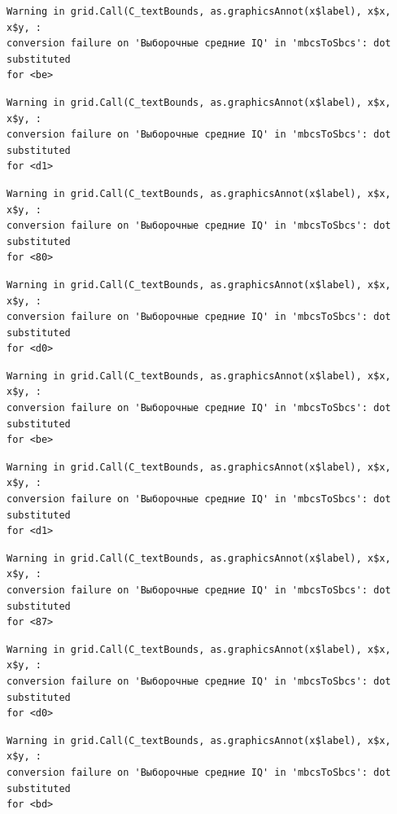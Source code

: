\documentclass[
  letterpaper,
]{scrbook}
\theoremstyle{definition}
\theoremstyle{remark}
\begin{document}
\begin{verbatim}
Warning in grid.Call(C_textBounds, as.graphicsAnnot(x$label), x$x, x$y, :
conversion failure on 'Выборочные средние IQ' in 'mbcsToSbcs': dot substituted
for <be>
\end{verbatim}

\begin{verbatim}
Warning in grid.Call(C_textBounds, as.graphicsAnnot(x$label), x$x, x$y, :
conversion failure on 'Выборочные средние IQ' in 'mbcsToSbcs': dot substituted
for <d1>
\end{verbatim}

\begin{verbatim}
Warning in grid.Call(C_textBounds, as.graphicsAnnot(x$label), x$x, x$y, :
conversion failure on 'Выборочные средние IQ' in 'mbcsToSbcs': dot substituted
for <80>
\end{verbatim}

\begin{verbatim}
Warning in grid.Call(C_textBounds, as.graphicsAnnot(x$label), x$x, x$y, :
conversion failure on 'Выборочные средние IQ' in 'mbcsToSbcs': dot substituted
for <d0>
\end{verbatim}

\begin{verbatim}
Warning in grid.Call(C_textBounds, as.graphicsAnnot(x$label), x$x, x$y, :
conversion failure on 'Выборочные средние IQ' in 'mbcsToSbcs': dot substituted
for <be>
\end{verbatim}

\begin{verbatim}
Warning in grid.Call(C_textBounds, as.graphicsAnnot(x$label), x$x, x$y, :
conversion failure on 'Выборочные средние IQ' in 'mbcsToSbcs': dot substituted
for <d1>
\end{verbatim}

\begin{verbatim}
Warning in grid.Call(C_textBounds, as.graphicsAnnot(x$label), x$x, x$y, :
conversion failure on 'Выборочные средние IQ' in 'mbcsToSbcs': dot substituted
for <87>
\end{verbatim}

\begin{verbatim}
Warning in grid.Call(C_textBounds, as.graphicsAnnot(x$label), x$x, x$y, :
conversion failure on 'Выборочные средние IQ' in 'mbcsToSbcs': dot substituted
for <d0>
\end{verbatim}

\begin{verbatim}
Warning in grid.Call(C_textBounds, as.graphicsAnnot(x$label), x$x, x$y, :
conversion failure on 'Выборочные средние IQ' in 'mbcsToSbcs': dot substituted
for <bd>
\end{verbatim}
\end{document}
